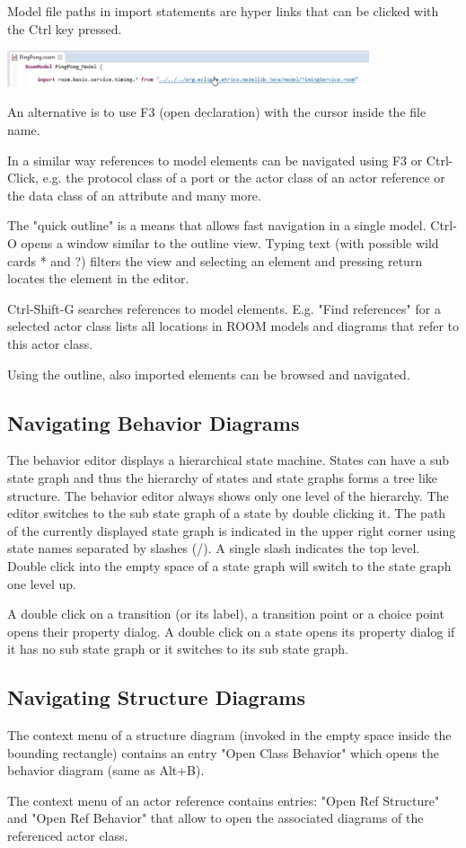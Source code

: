 Model file paths in import statements are hyper links that can be clicked with the Ctrl key pressed.

\includegraphics[width=0.8\textwidth]{images/041-open-declaration.jpg}

An alternative is to use F3 (open declaration) with the cursor inside the file name.

In a similar way references to model elements can be navigated using F3 or Ctrl-Click, e.g. the protocol class of a port
or the actor class of an actor reference or the data class of an attribute and many more.

The "quick outline" is a means that allows fast navigation in a single model.
Ctrl-O opens a window similar to the outline view. Typing text (with possible wild cards * and ?) filters the view and selecting an element
and pressing return locates the element in the editor.

Ctrl-Shift-G searches references to model elements. E.g. "Find references" for a selected actor class lists all locations in ROOM models
and diagrams that refer to this actor class.

Using the outline, also imported elements can be browsed and navigated.

\subsection{Navigating Behavior Diagrams}

The behavior editor displays a hierarchical state machine. States can have a sub state graph and thus the hierarchy of
states and state graphs forms a tree like structure. The \eTrice{} behavior editor always shows only one level of the
hierarchy. The editor switches to the sub state graph of a state by double clicking it. The path of the currently
displayed state graph is indicated in the upper right corner using state names separated by slashes (/).
A single slash indicates the top level.
Double click into the empty space of a state graph will switch to the state graph one level up.
 
A double click on a transition (or its label), a transition point or a choice point opens their property dialog.
A double click on a state opens its property dialog if it has no sub state graph or it switches to its sub state graph.

\subsection{Navigating Structure Diagrams}

The context menu of a structure diagram (invoked in the empty space inside the bounding rectangle) contains an entry "Open Class Behavior"
which opens the behavior diagram (same as Alt+B).

The context menu of an actor reference contains entries: "Open Ref Structure" and "Open Ref Behavior" that allow to open the associated
diagrams of the referenced actor class.

